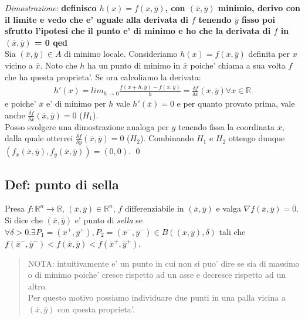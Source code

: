 \documentclass{article}
\begin{document}
\noindent \emph{Dimostrazione}: \textbf{definisco $h(x) = f(x, \overline{y})$,
con $(\overline{x},\overline{y})$ minimio, derivo con il limite e vedo che e' uguale
alla derivata di $f$ tenendo $\overline{y}$ fisso poi sfrutto l'ipotesi che il punto
e' di minimo e ho che la derivata di $f$ in $(\overline{x}, \overline{y})$ = 0 qed} \\
Sia $(\overline{x}, \overline{y}) \in A$ di minimo locale.
Consideriamo $h(x) = f(x,\overline{y})$ definita per $x$ vicino a $\overline{x}$.
Noto che $h$ ha un punto di minimo in $\overline{x}$ poiche' chiama a sua volta
$f$ che ha questa proprieta'. Se ora calcoliamo la derivata:
\begin{align*}
  h'(x) = lim_{h \to 0} \frac{f(x+h, \overline{y}) - f(x, \overline{y})}{h} =
  \frac{\delta f}{\delta x}(x, \overline{y}) \forall x \in \mathbb{R}
\end{align*}
e poiche' $\overline{x}$ e' di minimo per $h$ vale $h'(\overline{x}) = 0$ e per 
quanto provato prima, vale anche $\frac{\delta f}{\delta x}(\overline{x}, \overline{y}) = 0$ ($H_1$). \\
Posso svolgere una dimostrazione analoga per $y$ tenendo fissa la coordinata $\overline{x}$,
dalla quale otterrei $\frac{\delta f}{\delta y}(\overline{x}, \overline{y}) = 0$ ($H_2$).
Combinando $H_1$ e $H_2$ ottengo dunque $(f_x(\overline{x}, \overline{y}), f_y(\overline{x}, \overline{y})) = (0,0)$.
\qed

\subsection{Def: punto di sella}

Presa $f: \mathbb{R}^n \to \mathbb{R}$, $(\overline{x}, \overline{y}) \in \mathbb{R}^n$,
$f$ differenziabile in $(\overline{x}, \overline{y})$ e valga $\nabla f(\overline{x}, \overline{y}) = \overline{0}$.
Si dice che $(\overline{x}, \overline{y})$ e' punto di \emph{sella} se $\forall \delta
> 0. \exists P_1 = (\overline{x}^+, \overline{y}^+), P_2 = (\overline{x}^-, \overline{y}^-) \in
B((\overline{x}, \overline{y}), \delta)$ tali che $f(\overline{x}^-, \overline{y}^-) <
f(\overline{x}, \overline{y}) < f(\overline{x}^+, \overline{y}^+)$.

\begin{quote}
  NOTA: intuitivamente e' un punto in cui non si puo' dire se sia di massimo o
  di minimo poiche' cresce rispetto ad un asse e decresce rispetto ad un altro. \\
  Per questo motivo possiamo individuare due punti in una palla vicina a
  $(\overline{x}, \overline{y})$ con questa proprieta'.
\end{quote}
\end{document}
